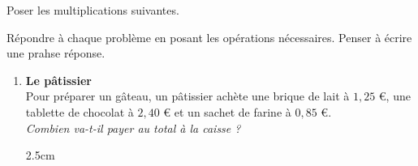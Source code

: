 \documentclass[a4paper]{book}
\begin{document}
{\begin{exercice}
\begin{minipage}{0.33\linewidth}
            \vspace{0.5cm}
        \end{minipage}        
        \hfill\vline\hfill
        \begin{minipage}{0.33\linewidth}
            \quad {}

            \begin{center}
                \points[10]
            \end{center}
        \end{minipage}            
    \end{exercice}


    \begin{exercice}
        Poser les multiplications suivantes.

        \medskip

        \begin{minipage}{0.33\linewidth}
            \quad {}

  
        \end{minipage}
        \hfill\vline\hfill
        \begin{minipage}{0.33\linewidth}
            \quad {}

        \end{minipage}        
        \hfill\vline\hfill
        \begin{minipage}{0.33\linewidth}
            \quad {}
            
        \end{minipage}
    \end{exercice}


\newpage


    \begin{exercice}
        Répondre à chaque problème en posant les opérations nécessaires. Penser à écrire une prahse réponse.
        
        \begin{enumerate}

            \item \textbf{Le pâtissier} \\
            Pour préparer un gâteau, un pâtissier achète une brique de lait à $1,25$ €, une tablette de chocolat à $2,40$ € et un sachet de farine à $0,85$ €. \\
            \textit{Combien va-t-il payer au total à la caisse ?}
            
            \begin{ZoneReponse}{2.5cm}
            \end{ZoneReponse}
        

\end{enumerate}
\end{exercice}}
\end{document}
